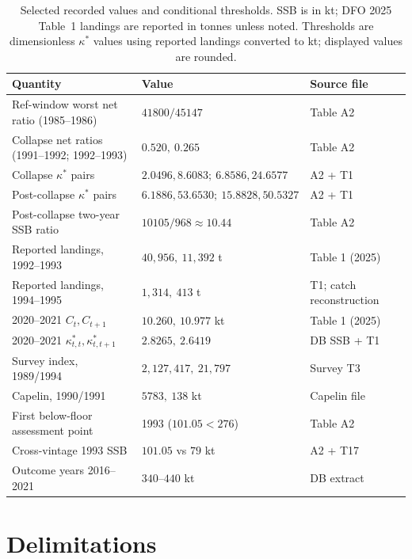 \documentclass[10pt,twocolumn]{article}
\theoremstyle{plain}
\theoremstyle{remark}
\begin{document}
\begin{table}[t]
\centering
\scriptsize
\setlength{\tabcolsep}{2.8pt}
\caption{Selected recorded values and conditional thresholds. SSB is in kt; DFO 2025 Table~1 landings are reported in tonnes unless noted. Thresholds are dimensionless \(\kappa^*\) values using reported landings converted to kt; displayed values are rounded.}
\label{tab:summary}
\begin{tabular}{@{}l l l@{}}
\toprule
Quantity & Value & Source file \\
\midrule
Ref-window worst net ratio (1985--1986) & \(41800/45147\) & Table A2 \\
Collapse net ratios (1991--1992; 1992--1993) & \(0.520,\ 0.265\) & Table A2 \\
Collapse \(\kappa^*\) pairs \((C_t,C_{t+1}) & \(2.0496,8.6083;\ 6.8586,24.6577\) & A2 + T1 \\
Post-collapse \(\kappa^*\) pairs & \(6.1886,53.6530;\ 15.8828,50.5327\) & A2 + T1 \\
Post-collapse two-year SSB ratio & \(10105/968 \approx 10.44\) & Table A2 \\
Reported landings, 1992--1993 & \(40{,}956,\ 11{,}392\) t & Table 1 (2025) \\
Reported landings, 1994--1995 & \(1{,}314,\ 413\) t & T1; catch reconstruction \\
2020--2021 \(C_t,C_{t+1}\) & \(10.260,\ 10.977\) kt & Table 1 (2025) \\
2020--2021 \(\kappa^*_{t,t},\kappa^*_{t,t+1}\) & \(2.8265,\ 2.6419\) & DB SSB + T1 \\
Survey index, 1989/1994 & \(2{,}127{,}417,\ 21{,}797\) & Survey T3 \\
Capelin, 1990/1991 & \(5783,\ 138\) kt & Capelin file \\
First below-floor assessment point & 1993 (\(101.05 < 276\)) & Table A2 \\
Cross-vintage 1993 SSB & \(101.05\) vs \(79\) kt & A2 + T17 \\
Outcome years 2016--2021 & \(340\)--\(440\) kt & DB extract \\
\bottomrule
\end{tabular}
\end{table}

\section{Delimitations}\label{scope}
\end{document}
